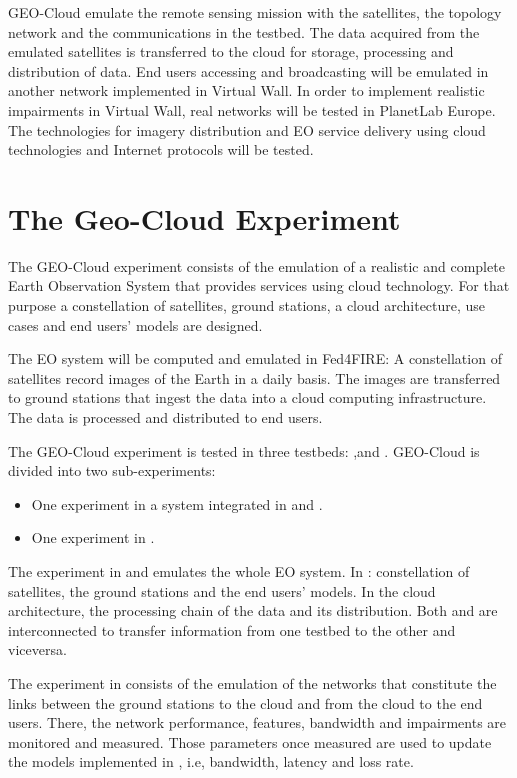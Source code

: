 GEO-Cloud  emulate the remote sensing mission with the satellites, the
topology network and the communications in the \vw testbed. The data
acquired from the emulated satellites is transferred to the \bonfire cloud
for storage, processing and distribution of data. End users accessing and
broadcasting will be emulated in another network implemented in Virtual Wall. In
order to implement realistic impairments in Virtual Wall, real networks will be
tested in PlanetLab Europe.  The technologies for imagery distribution and EO
service delivery using cloud technologies and Internet protocols will be tested.

\section{The Geo-Cloud Experiment}

The GEO-Cloud experiment consists of the emulation of a realistic and complete Earth Observation System that provides services using cloud technology. For that purpose a constellation of satellites, ground stations, a cloud architecture, use cases and end users' models are designed.

The EO system will be computed and emulated in Fed4FIRE: A constellation of satellites record images of the Earth in a daily basis. The images are transferred to ground stations that ingest the data into a cloud computing infrastructure. The data is processed and distributed to end users.

The GEO-Cloud experiment is tested in three testbeds: \vw,\bonfire and
\pl. GEO-Cloud is divided into two sub-experiments:
\begin{itemize}
\item One experiment in a system integrated in \vw and \bonfire.
\item One experiment in \pl.
\end{itemize}

The experiment in \vw and \bonfire emulates the whole EO system. In \vw:
constellation of satellites, the ground stations and the end users' models. In
\bonfire the cloud architecture, the processing chain of the data and its
distribution. Both \vw and \bonfire are interconnected to transfer information from one testbed to the other and viceversa.

The experiment in \pl consists of the emulation of the networks that constitute
the links between the ground stations to the cloud and from the cloud to the end
users. There, the network performance, features, bandwidth and impairments are
monitored and measured. Those parameters once measured are used to update the
models implemented in \vw, i.e, bandwidth, latency and loss rate.

